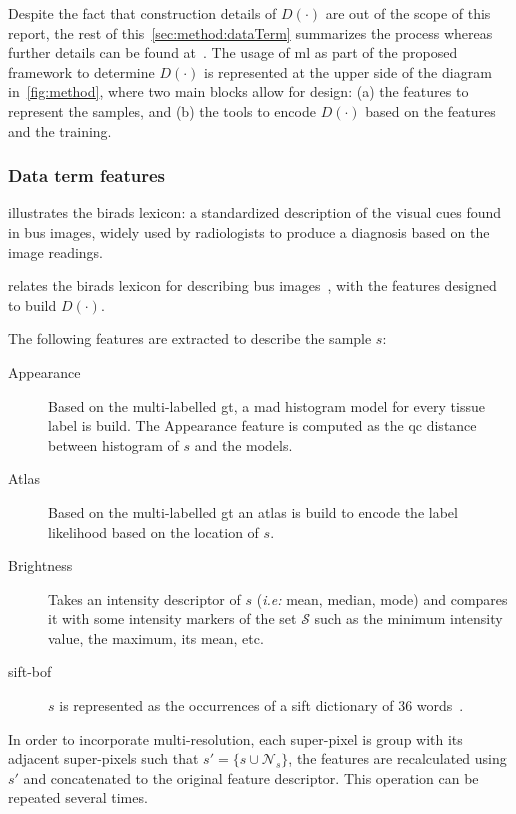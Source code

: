 Despite the fact that construction details of $D(\cdot)$ are out of the scope of this report, the rest of this~\cref{sec:method:dataTerm} summarizes the process whereas further details can be found at~\citeauthor{sikphd}.
The usage of \ac{ml} as part of the proposed framework to determine $D(\cdot)$ is represented at the upper side of the diagram in~\cref{fig:method},
where two main blocks allow for design: 
(a) the features to represent the samples,
and (b) the tools to encode $D(\cdot)$ based on the features and the training. 

\subsubsection{Data term features}
 illustrates the \ac{birads} lexicon: a standardized description of the visual cues found in \ac{bus} images, widely used by radiologists to produce a diagnosis based on the image readings. 

 relates the \ac{birads} lexicon for describing \ac{bus} images~\cite{biradsus}, with the features designed to build $D(\cdot)$.

The following features are extracted to describe the sample $s$:
\begin{description}
  \item[Appearance] 
    Based on the multi-labelled \ac{gt}, a \ac{mad} histogram model for every tissue label is build. The Appearance feature is computed as the \ac{qc} distance between histogram of $s$ and the models.
  \item[Atlas] 
    Based on the multi-labelled \ac{gt} an atlas is build to encode the label likelihood based on the location of $s$.
  \item[Brightness] 
    Takes an intensity descriptor of $s$ (\emph{i.e:} mean, median, mode) and compares it with some intensity markers of the set $\mathcal{S}$ such as the minimum intensity value, the maximum, its mean, etc.
  \item[\ac{sift}-\ac{bof}]
    $s$ is represented as the occurrences of a \ac{sift} dictionary of 36 words~\cite{siksift}.
\end{description}

In order to incorporate multi-resolution, each super-pixel is group with its adjacent super-pixels such that $s' = \{s \cup \mathcal{N}_{s}\}$, the features are recalculated using $s'$ and concatenated to the original feature descriptor. This operation can be repeated several times.

